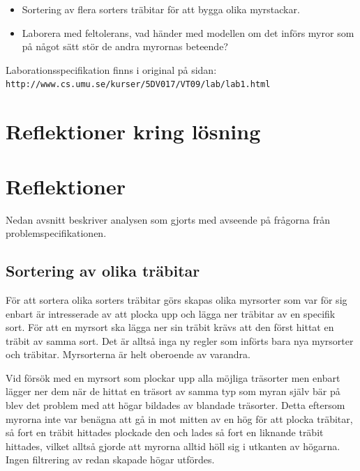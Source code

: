 \documentclass[titlepage, a4paper, 12pt]{article}
\begin{document}
\begin{itemize}
\item Sortering av flera sorters träbitar för att bygga olika
  myrstackar.
\item Laborera med feltolerans, vad händer med modellen om det införs
  myror som på något sätt stör de andra myrornas beteende?
\end{itemize}

Laborationsspecifikation finns i original på sidan:\\
\verb!http://www.cs.umu.se/kurser/5DV017/VT09/lab/lab1.html!

\section{Reflektioner kring lösning}


\section{Reflektioner}
Nedan avsnitt beskriver analysen som gjorts med avseende på frågorna
från problemspecifikationen.

\subsection{Sortering av olika träbitar}

För att sortera olika sorters träbitar görs skapas olika myrsorter som
var för sig enbart är intresserade av att plocka upp och lägga ner
träbitar av en specifik sort. För att en myrsort ska lägga ner sin
träbit krävs att den först hittat en träbit av samma sort. Det är
alltså inga ny regler som införts bara nya myrsorter och
träbitar. Myrsorterna är helt oberoende av varandra.

Vid försök med en myrsort som plockar upp alla möjliga träsorter men
enbart lägger ner dem när de hittat en träsort av samma typ som myran
själv bär på blev det problem med att högar bildades av blandade
träsorter. Detta eftersom myrorna inte var benägna att gå in mot
mitten av en hög för att plocka träbitar, så fort en träbit hittades
plockade den och lades så fort en liknande träbit hittades, vilket
alltså gjorde att myrorna alltid höll sig i utkanten av högarna. Ingen
filtrering av redan skapade högar utfördes.
\end{document}
